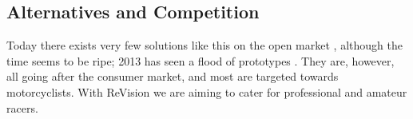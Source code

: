 \subsection{Alternatives and Competition}
Today there exists very few solutions like this on the open market \cite{motionResearch:sportvue}, although the time seems to be ripe; 2013 has seen a 
flood of prototypes \cite{skully,caranddriver:nissan_3E,cycleworld:nuviz,popularscience:livemap}. They are, however, all going after the consumer 
market, and most are targeted towards motorcyclists.
With ReVision we are aiming to cater for professional and amateur racers. 



